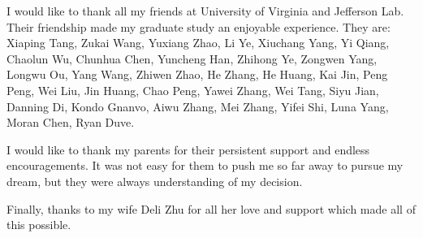 I would like to thank all my friends at University of Virginia and Jefferson Lab. Their friendship made my graduate study an enjoyable experience. They are: Xiaping Tang, Zukai Wang, Yuxiang Zhao, Li Ye, Xiuchang Yang, Yi Qiang, Chaolun Wu, Chunhua Chen, Yuncheng Han, Zhihong Ye, Zongwen Yang, Longwu Ou, Yang Wang, Zhiwen Zhao, He Zhang, He Huang, Kai Jin, Peng Peng, Wei Liu, Jin Huang, Chao Peng, Yawei Zhang, Wei Tang, Siyu Jian, Danning Di, Kondo Gnanvo, Aiwu Zhang, Mei Zhang, Yifei Shi, Luna Yang, Moran Chen, Ryan Duve.

I would like to thank my parents for their persistent support and endless encouragements. It was not easy for them to push me so far away to pursue my dream, but they were always understanding of my decision.

Finally, thanks to my wife Deli Zhu for all her love and support which made all of this possible.

